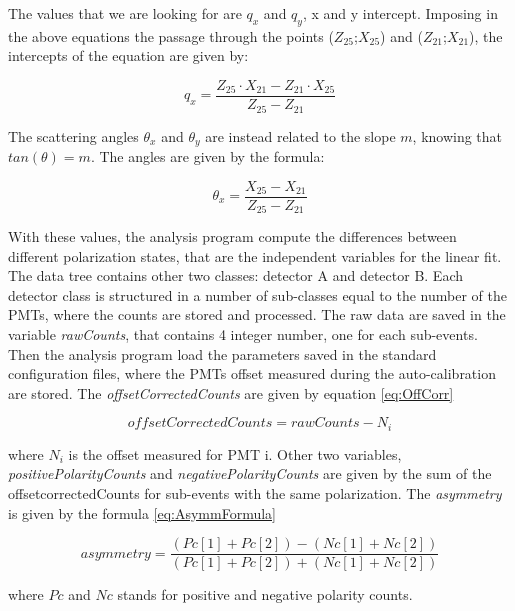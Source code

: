 \begin{appendices}
The values that we are looking for are $q_{x}$ and $q_{y}$, x and y intercept. 
Imposing in the above equations the passage through the points ($Z_{25}$;$X_{25}$) and ($Z_{21}$;$X_{21}$), the intercepts of the equation are given by:

\begin{equation}
q_{x} = \dfrac{Z_{25} \cdot X_{21} - Z_{21} \cdot X_{25}}{Z_{25} - Z_{21}}
\end{equation} 

The scattering angles $\theta_{x}$ and $\theta_{y}$ are instead related to the slope $m$, knowing that $tan(\theta) = m$. The angles are given by the formula:

\begin{equation}
\theta_{x} = \dfrac{X_{25} - X_{21}}{Z_{25} - Z_{21}}
\end{equation}

With these values, the analysis program compute the differences between different polarization states, that are the independent variables for the linear fit. 
The data tree contains other two classes: detector A and detector B. Each detector class is structured in a number of sub-classes equal to the number of the PMTs, where the counts are stored and processed. The raw data are saved in the variable \textit{rawCounts}, that contains 4 integer number, one for each sub-events. Then the analysis program load the parameters saved in the standard configuration files, where the PMTs offset measured during the auto-calibration are stored. The \textit{offsetCorrectedCounts} are given by equation \ref{eq:OffCorr}

\begin{equation} \label{eq:OffCorr}
offsetCorrectedCounts = rawCounts - N_{i}
\end{equation} 

where $N_{i}$ is the offset measured for PMT i. Other two variables, \textit{positivePolarityCounts} and \textit{negativePolarityCounts} are given by the sum of the offsetcorrectedCounts for sub-events with the same polarization. The \textit{asymmetry} is given by the formula \ref{eq:AsymmFormula}

\begin{equation} \label{eq:AsymmFormula}
asymmetry = \dfrac{(Pc[1] + Pc[2]) - (Nc[1] + Nc[2])}{(Pc[1] + Pc[2]) + (Nc[1] + Nc[2])}
\end{equation}

where $Pc$ and $Nc$ stands for positive and negative polarity counts. 
\end{appendices}